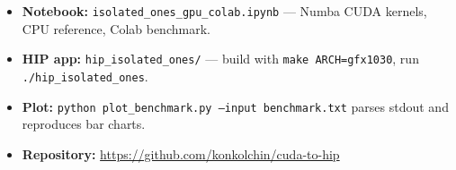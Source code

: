 \documentclass[11pt,a4paper]{article}
\begin{document}
\begin{itemize}
  \item \textbf{Notebook:} \texttt{isolated\_ones\_gpu\_colab.ipynb} --- Numba
        CUDA kernels, CPU reference, Colab benchmark.
  \item \textbf{HIP app:} \texttt{hip\_isolated\_ones/} --- build with
        \texttt{make ARCH=gfx1030}, run \texttt{./hip\_isolated\_ones}.
  \item \textbf{Plot:} \texttt{python plot\_benchmark.py --input benchmark.txt}
        parses stdout and reproduces bar charts.
  \item \textbf{Repository:} \url{https://github.com/konkolchin/cuda-to-hip}
\end{itemize}



\end{document}
